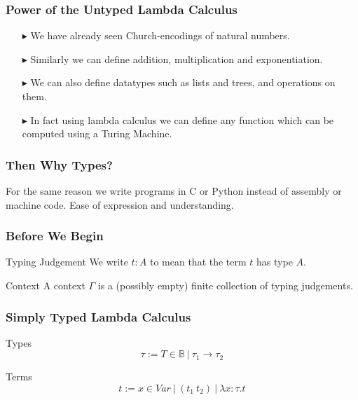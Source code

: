 \documentclass[14pt,compress]{beamer}
\begin{document}
\begin{frame}\label{frame : power of lambda}
\frametitle{Power of the Untyped Lambda Calculus}
\begin{enumerate}
\pause
\item[$\blacktriangleright$] We have already seen Church-encodings of natural numbers.
\pause
\item[$\blacktriangleright$] Similarly we can define addition, multiplication and exponentiation.
\pause
\item[$\blacktriangleright$] We can also define datatypes such as lists and trees, and operations on them.
\pause
\item[$\blacktriangleright$] In fact using lambda calculus we can define any function
which can be computed using a Turing Machine.
\end{enumerate}
\end{frame}

\begin{frame}\label{frame : why types}
\frametitle{Then Why Types?}
For the same reason we write programs in C or Python instead of assembly or machine code.
Ease of expression and understanding. 
\end{frame}
\begin{frame}\label{frame : before we begin}
\frametitle{Before We Begin}

\begin{block}{Typing Judgement}
We write $t : A$ to mean that the term $t$ has type $A$.
\end{block}

\begin{block}{Context}
A context $\Gamma$ is a (possibly empty) finite collection of typing judgements.
\end{block}

\end{frame}
\begin{frame}\label{frame : terms and types of simply typed lambda calculus}
\frametitle{Simply Typed Lambda Calculus}

\begin{block}{Types}
\[ \tau := T\in \mathbb{B}\ |\ \tau _1 \to \tau _2 \] 
\end{block}

\begin{block}{Terms}
\[ t := x \in Var\ |\ (t_1\ t_2)\ |\ \lambda x{:}\tau.t \]
\end{block}
\end{frame}
\end{document}
